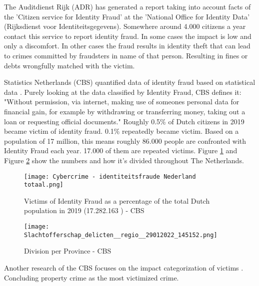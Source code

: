 The Auditdienst Rijk (ADR)\cite{ADR} has generated a report taking into account facts of the 'Citizen service for Identity Fraud' at the 'National Office for Identity Data' (Rijksdienst voor Identiteitsgegevens). Somewhere around 4.000 citizens a year contact this service to report identity fraud. In some cases the impact is low and only a discomfort. In other cases the fraud results in identity theft that can lead to crimes committed by fraudsters in name of that person. Resulting in fines or debts wrongfully matched with the victim.\par 

Statistics Netherlands (CBS) quantified data of identity fraud based on statistical data \cite{CBS_DigitaleVeiligheid}. Purely looking at the data classified by Identity Fraud, CBS defines it: "Without permission, via internet, making use of someones personal data for financial gain, for example by withdrawing or transferring money, taking out a loan or requesting official documents." Roughly 0.5\% of Dutch citizens in 2019 became victim of identity fraud. 0.1\% repeatedly became victim. Based on a population of 17 million, this means roughly 86.000 people are confronted with Identity Fraud each year. 17.000 of them are repeated victims. Figure \ref{fig:CBS_Total_ID_fraud} and Figure \ref{fig:CBS_ID_fraud} show the numbers and how it's divided throughout The Netherlands.

    
    \begin{figure}
        \graphicspath{ {./images/} }
        \texttt{[image: Cybercrime - identiteitsfraude Nederland totaal.png]}\\
        \caption{Victims of Identity Fraud \cite{CBS_IDFraudTable} as a percentage of the total Dutch population in 2019 (17.282.163 \cite{CBS_totalpopulation2019}) - CBS}  
        \label{fig:CBS_Total_ID_fraud}
    \end{figure}

    
    \begin{figure}
        \graphicspath{ {./images/} }
        \texttt{[image: Slachtofferschap\_delicten\_\_regio\_\_29012022\_145152.png]}\\
        \caption{Division per Province  \cite{CBS_IDFraudTable} - CBS}  
        \label{fig:CBS_ID_fraud}
    \end{figure}

Another research of the CBS focuses on the impact categorization of victims {\cite{CBS_casualtiesDigitalCrime}}. Concluding property crime as the most victimized crime. 

